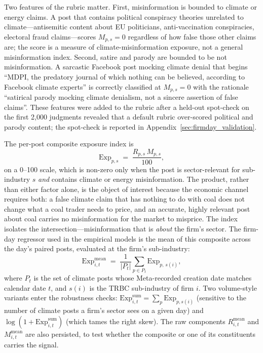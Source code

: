 \documentclass{article}
\theoremstyle{plain}
\begin{document}
Two features of the rubric matter. First, misinformation is bounded to climate or energy claims. A post that contains political conspiracy theories unrelated to climate---antisemitic content about EU politicians, anti-vaccination conspiracies, electoral fraud claims---scores $M_{p,s}=0$ regardless of how false those other claims are; the score is a measure of climate-misinformation exposure, not a general misinformation index. Second, satire and parody are bounded to be not misinformation. A sarcastic Facebook post mocking climate denial that begins ``MDPI, the predatory journal of which nothing can be believed, according to Facebook climate experts'' is correctly classified at $M_{p,s}=0$ with the rationale ``satirical parody mocking climate denialism, not a sincere assertion of false claims''. These features were added to the rubric after a held-out spot-check on the first 2,000 judgments revealed that a default rubric over-scored political and parody content; the spot-check is reported in Appendix~\ref{sec:firmday_validation}.

The per-post composite exposure index is
\begin{equation}
\mathrm{Exp}_{p,s} \;=\; \frac{R_{p,s}\,M_{p,s}}{100},
\label{eq:exposure_post}
\end{equation}
on a 0--100 scale, which is non-zero only when the post is sector-relevant for sub-industry $s$ \emph{and} contains climate or energy misinformation. The product, rather than either factor alone, is the object of interest because the economic channel requires both: a false climate claim that has nothing to do with coal does not change what a coal trader needs to price, and an accurate, highly relevant post about coal carries no misinformation for the market to misprice. The index isolates the intersection---misinformation that is \emph{about} the firm's sector. The firm-day regressor used in the empirical models is the mean of this composite across the day's paired posts, evaluated at the firm's sub-industry:
\begin{equation}
\mathrm{Exp}^{\text{mean}}_{i,t} \;=\; \frac{1}{|P_t|}\sum_{p \in P_t} \mathrm{Exp}_{p,\,s(i)},
\label{eq:exposure_firmday}
\end{equation}
where $P_t$ is the set of climate posts whose Meta-recorded creation date matches calendar date $t$, and $s(i)$ is the TRBC sub-industry of firm $i$. Two volume-style variants enter the robustness checks: $\mathrm{Exp}^{\text{sum}}_{i,t}=\sum_p \mathrm{Exp}_{p,s(i)}$ (sensitive to the number of climate posts a firm's sector sees on a given day) and $\log(1+\mathrm{Exp}^{\text{sum}}_{i,t})$ (which tames the right skew). The raw components $R^{\text{mean}}_{i,t}$ and $M^{\text{mean}}_{i,t}$ are also persisted, to test whether the composite or one of its constituents carries the signal.
\end{document}
